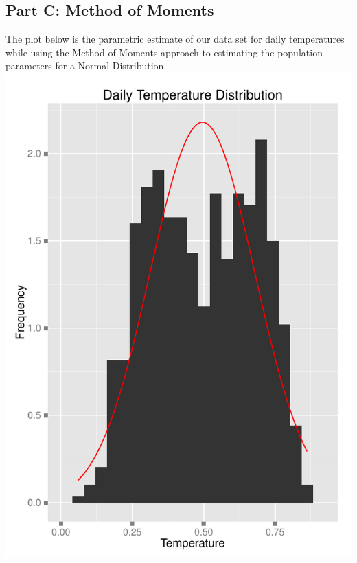 \documentclass[11pt]{article}
\begin{document}
\subsection{Part C: Method of Moments}
\label{subsesc:problem3moments}
The plot below is the parametric estimate of our data set for daily temperatures while using the Method of Moments approach to estimating the population parameters for a Normal Distribution. 
\newline
\includegraphics{Problem3CMoments.pdf}
\newline
\pagebreak
\end{document}
